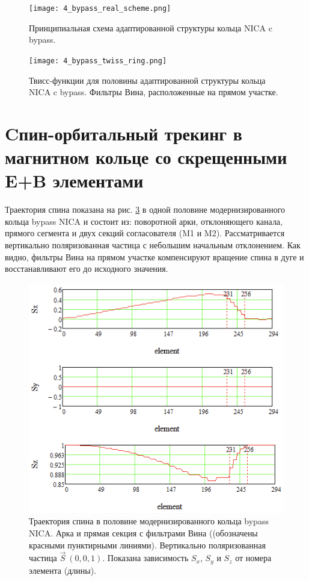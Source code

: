 \begin{figure}[!h]
  \centering
   \texttt{[image: 4\_bypass\_real\_scheme.png]}
   \caption{Принципиальная схема адаптированной структуры кольца NICA c bypass.}
   \label{fig:4_bypass_real_scheme}
\end{figure}

\begin{figure}[!h]
  \centering
   \texttt{[image: 4\_bypass\_twiss\_ring.png]}
   \caption{Твисс-функции для половины адаптированной структуры кольца NICA c bypass. Фильтры Вина, расположенные на прямом участке.}
   \label{fig:4_bypass_twiss_ring}
\end{figure}

\newpage
	
	\section{Cпин-орбитальный трекинг в магнитном кольце со скрещенными E+B элементами} \label{sec:EDM/Wien_filter_tracking}

\par Траектория спина показана на рис. \ref{fig:4bypassspin} в одной половине модернизированного кольца bypass NICA и состоит из: поворотной арки, отклоняющего канала, прямого сегмента и двух секций согласователя (M1 и M2). Рассматривается вертикально поляризованная частица с небольшим начальным отклонением. Как видно, фильтры Вина на прямом участке компенсируют вращение спина в дуге и восстанавливают его до исходного значения.

\begin{figure}[!h]
	\centering
	\includegraphics[width=0.7\linewidth]{images/4_bypass_spin}
	\caption{Траектория спина в половине модернизированного кольца bypass NICA. Арка и прямая секция с фильтрами Вина ((обозначены красными пунктирными линиями). Вертикально поляризованная частица $\vec{S}~(0,0,1)$. Показана зависимость $S_{x}$, $S_{y}$ и $S_{z}$ от номера элемента (длины).}
	\label{fig:4bypassspin}
\end{figure}

